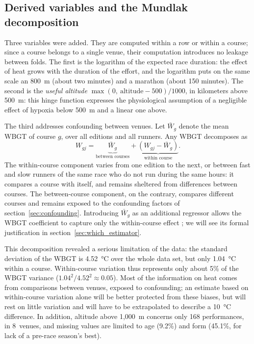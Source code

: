 \documentclass[11pt,a4paper]{article}
\begin{document}
\subsection{Derived variables and the Mundlak decomposition}\label{sec:mundlak}

Three variables were added. They are computed within a row or within a course; since a course belongs to a single
venue, their computation introduces no leakage between folds. The first is the logarithm of the expected race
duration: the effect of heat grows with the duration of the effort, and the logarithm puts on the same scale an
800~m (about two minutes) and a marathon (about 150 minutes). The second is the \emph{useful altitude}
$\max(0,\ \text{altitude} - 500)/1000$, in kilometers above 500~m: this hinge function expresses the physiological
assumption of a negligible effect of hypoxia below 500~m and a linear one above.

The third addresses confounding between venues. Let $\bar W_g$ denote the mean WBGT of course $g$, over all editions
and all runners. Any WBGT decomposes as
\begin{equation}\label{eq:mundlak}
W_{gj} = \underbrace{\bar W_g}_{\text{between courses}} + \underbrace{(W_{gj} - \bar W_g)}_{\text{within course}} .
\end{equation}
The within-course component varies from one edition to the next, or between fast and slow runners of the same race
who do not run during the same hours: it compares a course with itself, and remains sheltered from differences
between courses. The between-course component, on the contrary, compares different courses and remains exposed to the
confounding factors of section~\ref{sec:confounding}. Introducing $\bar W_g$ as an additional regressor allows the
WBGT coefficient to capture only the within-course effect \citep{mundlak1978}; we will see its formal justification in
section~\ref{sec:which_estimator}.

This decomposition revealed a serious limitation of the data: the standard deviation of the WBGT is 4.52~°C over the
whole data set, but only 1.04~°C within a course. Within-course variation thus represents only about 5\% of the WBGT
variance ($1.04^2/4.52^2 \approx 0.05$). Most of the information on heat comes from comparisons between venues,
exposed to confounding; an estimate based on within-course variation alone will be better protected from these
biases, but will rest on little variation and will have to be extrapolated to describe a 10~°C difference. In
addition, altitude above 1,000~m concerns only 168 performances, in 8~venues, and missing values are limited to age
(9.2\%) and form (45.1\%, for lack of a pre-race season's best).
\end{document}
